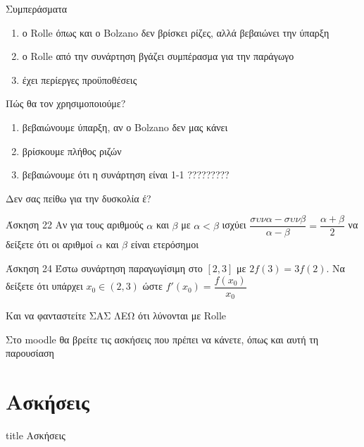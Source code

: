 \documentclass{presentation}
\begin{document}
\begin{frame}{Συμπεράσματα}
  \begin{enumerate}
    \item<1-> ο Rolle όπως και ο Bolzano δεν βρίσκει ρίζες, αλλά βεβαιώνει την ύπαρξη
    \item<2-> ο Rolle από την συνάρτηση βγάζει συμπέρασμα για την παράγωγο
    \item<3-> έχει περίεργες προϋποθέσεις
  \end{enumerate}
\end{frame}

\begin{frame}{Πώς θα τον χρησιμοποιούμε?}
  \begin{enumerate}
    \item<1-> βεβαιώνουμε ύπαρξη, αν ο Bolzano δεν μας κάνει
    \item<2-> βρίσκουμε πλήθος ριζών
    \item<3-> βεβαιώνουμε ότι η συνάρτηση είναι 1-1 ?????????
  \end{enumerate}
\end{frame}

\begin{frame}{Δεν σας πείθω για την δυσκολία έ?}
  \begin{block}{Άσκηση 22}
    Αν για τους αριθμούς $α$ και $β$ με $α<β$ ισχύει $\dfrac{συνα-συνβ}{α-β}=\dfrac{α+β}{2}$ να δείξετε ότι οι αριθμοί $α$ και $β$ είναι ετερόσημοι
  \end{block}
  \begin{block}{Άσκηση 24}
    Έστω συνάρτηση παραγωγίσιμη στο $[2,3]$ με $2f(3)=3f(2)$. Να δείξετε ότι υπάρχει $x_0\in (2,3)$ ώστε $f'(x_0)=\dfrac{f(x_0)}{x_0}$
  \end{block}
   Και να φανταστείτε ΣΑΣ ΛΕΩ ότι λύνονται με Rolle
\end{frame}


\begin{frame}[noframenumbering]
  Στο moodle θα βρείτε τις ασκήσεις που πρέπει να κάνετε, όπως και αυτή τη παρουσίαση
\end{frame}

\section{Ασκήσεις}

\begin{frame}[noframenumbering]
  \vfill
  \centering
  \begin{beamercolorbox}[sep=8pt,center,shadow=true,rounded=true]{title}
    Ασκήσεις
  \end{beamercolorbox}
  \vfill
\end{frame}
\end{document}
